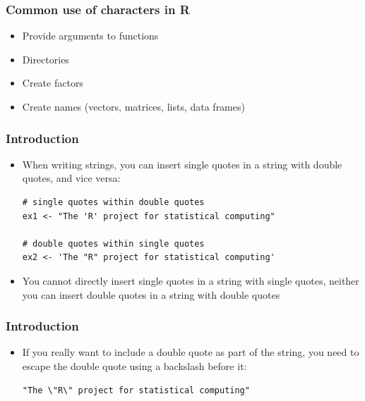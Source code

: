 \documentclass[xcolor=dvipsnames, xcolor=table]{beamer} %
\theoremstyle{mystyle}
\begin{document}
\begin{frame}
\frametitle{Common use of characters in R}

\begin{itemize}
\item Provide arguments to functions
\item Directories
\item Create factors
\item Create names (vectors, matrices, lists, data frames)
\end{itemize}
\end{frame}

\begin{frame}[fragile] %
\frametitle{Introduction}

\begin{itemize}

\item When writing strings, you can insert single quotes in a string with double quotes, and vice versa:

\begin{verbatim}
# single quotes within double quotes
ex1 <- "The 'R' project for statistical computing"

# double quotes within single quotes
ex2 <- 'The "R" project for statistical computing'
\end{verbatim}

\item You cannot directly insert single quotes in a string with single quotes, neither you can insert double quotes in a string with double quotes

\end{itemize}
\end{frame}

\begin{frame}[fragile] %
\frametitle{Introduction}

\begin{itemize}

\item If you really want to include a double quote as part of the string, you need to escape the double quote using a backslash before it:

\begin{verbatim}
"The \"R\" project for statistical computing"
\end{verbatim}

\end{itemize}
\end{frame}
\end{document}
